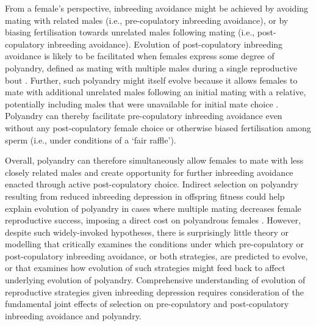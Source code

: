 \documentclass[12pt]{article}
\begin{document}
From a female's perspective, inbreeding avoidance might be achieved by avoiding mating with related males (i.e., pre-copulatory inbreeding avoidance), or by biasing fertilisation towards unrelated males following mating (i.e., post-copulatory inbreeding avoidance). Evolution of post-copulatory inbreeding avoidance is likely to be facilitated when females express some degree of polyandry, defined as mating with multiple males during a single reproductive bout \cite[but see][]{Dougherty2016}. Further, such polyandry might itself evolve because it allows females to mate with additional unrelated males following an initial mating with a relative, potentially including males that were unavailable for initial mate choice \cite[e.g.,][]{Reid2015, Duthie}. Polyandry can thereby facilitate pre-copulatory inbreeding avoidance even without any post-copulatory female choice or otherwise biased fertilisation among sperm (i.e., under conditions of a `fair raffle').

Overall, polyandry can therefore simultaneously allow females to mate with less closely related males and create opportunity for further inbreeding avoidance enacted through active post-copulatory choice. Indirect selection on polyandry resulting from reduced inbreeding depression in offspring fitness could help explain evolution of polyandry in cases where multiple mating decreases female reproductive success, imposing a direct cost on polyandrous females \cite[][]{Zeh1997, Jennions2000, Tregenza2002}. However, despite such widely-invoked hypotheses, there is surprisingly little theory or modelling that critically examines the conditions under which pre-copulatory or post-copulatory inbreeding avoidance, or both strategies, are predicted to evolve, or that examines how evolution of such strategies might feed back to affect underlying evolution of polyandry. Comprehensive understanding of evolution of reproductive strategies given inbreeding depression requires consideration of the fundamental joint effects of selection on pre-copulatory and post-copulatory inbreeding avoidance and polyandry.
\end{document}
